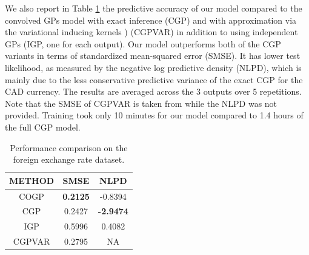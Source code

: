 We also report in Table \ref{tab:fx} the predictive accuracy of our model compared to the convolved GPs model with exact inference \citet{alvarez-lawrence-nips-08} (CGP) and with approximation via the variational inducing kernels \citet{alvarez2010efficient}) (CGPVAR) in addition to using independent GPs (IGP, one for each output).
Our model outperforms both of the CGP variants in terms of standardized mean-squared error (SMSE).
It has lower test likelihood, as measured by the negative log predictive density (NLPD), which is mainly due to the less conservative predictive variance of the exact CGP for the CAD currency.
The results are averaged across the 3 outputs over 5 repetitions.
Note that the SMSE of CGPVAR is taken from \citet{alvarez2010efficient} while the NLPD was not provided.
Training took only 10 minutes for our model compared to 1.4 hours of the full CGP model.

\begin{table}[h]
\caption{Performance comparison on the foreign exchange rate dataset.}
\label{tab:fx}
\begin{center}
\begin{tabular}{c|c|c}
METHOD & SMSE & NLPD \\ \hline
COGP  & \textbf{0.2125} & -0.8394 \\
CGP & 0.2427 & \textbf{-2.9474} \\
IGP & 0.5996 & 0.4082 \\
CGPVAR & 0.2795 & NA 
\end{tabular}
\end{center}
\end{table}

